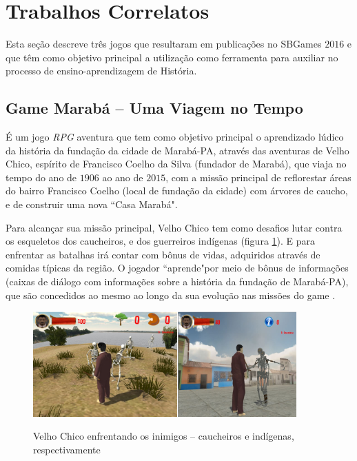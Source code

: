 \section{Trabalhos Correlatos}
\label{sec:correlatos}

Esta seção descreve três jogos que resultaram em publicações no SBGames $2016$ e que têm como objetivo principal a utilização como ferramenta para auxiliar no processo de ensino-aprendizagem de História.

\subsection{Game Marabá -- Uma Viagem no Tempo} 

É um jogo \textit{RPG} aventura que tem como objetivo principal o aprendizado lúdico da história da fundação da cidade de Marabá-PA, através das aventuras de Velho Chico, espírito de Francisco Coelho da Silva (fundador de Marabá), que viaja no tempo do ano de $1906$ ao ano de $2015$, com a missão principal de reflorestar áreas do bairro Francisco Coelho (local de fundação da cidade) com árvores de caucho, e de construir uma nova ``Casa Marabá".

Para alcançar sua missão principal, Velho Chico tem como desafios lutar contra os esqueletos dos caucheiros, e dos guerreiros indígenas (figura \ref{fig:game-maraba}). E para enfrentar as batalhas irá contar com bônus de vidas, adquiridos através de comidas típicas da região. O jogador ``aprende"\space por meio de bônus de informações (caixas de diálogo com informações sobre a história da fundação de Marabá-PA), que são concedidos ao mesmo ao longo da sua evolução nas missões do game \cite{bib:teixeira2016}.

\begin{figure}[H]
	\centering
	\caption{Velho Chico enfrentando os inimigos -- caucheiros e indígenas, respectivamente}
	\includegraphics[width=0.9\textwidth]{figuras/game_maraba.png}
	\label{fig:game-maraba}
	{}
\end{figure}

